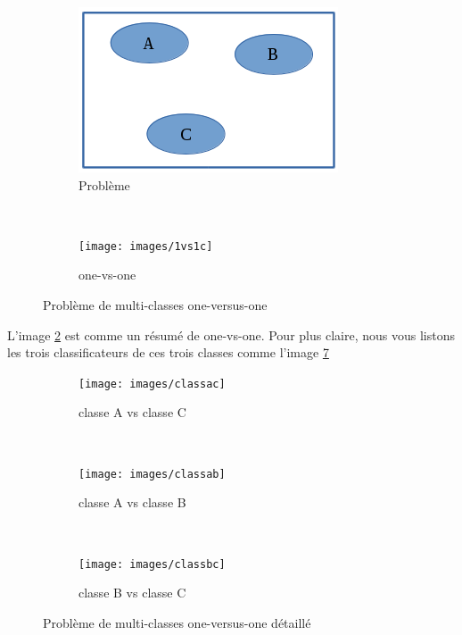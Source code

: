 \begin{figure}[H]
        \centering
        \begin{subfigure}[b]{0.5\textwidth}
                \includegraphics[width=\textwidth]{images/multiclass}
                \caption{Problème}
                \label{mclass}
        \end{subfigure}%
        ~ %
        \begin{subfigure}[b]{0.5\textwidth}
                \texttt{[image: images/1vs1c]}
                \caption{one-vs-one}
                \label{1vs1c}
        \end{subfigure}
        \caption{Problème de multi-classes one-versus-one}\label{mulclass}
\end{figure}


L'image \ref{1vs1c} est comme un résumé de one-vs-one. Pour plus claire, nous vous listons les trois classificateurs de ces trois classes comme l'image \ref{1vs1detail}

\begin{figure}[H]
        \centering
        \begin{subfigure}[b]{0.3\textwidth}
                \texttt{[image: images/classac]}
                \caption{classe A vs classe C}
                \label{classac}
        \end{subfigure}%
        ~ %
        \begin{subfigure}[b]{0.3\textwidth}
                \texttt{[image: images/classab]}
                \caption{classe A vs classe B}
                \label{classab}
        \end{subfigure}
        ~ %
        \begin{subfigure}[b]{0.30\textwidth}
                \texttt{[image: images/classbc]}
                \caption{classe B vs classe C}
                \label{classbc}
        \end{subfigure}
        \caption{Problème de multi-classes one-versus-one détaillé}\label{1vs1detail}
\end{figure}


